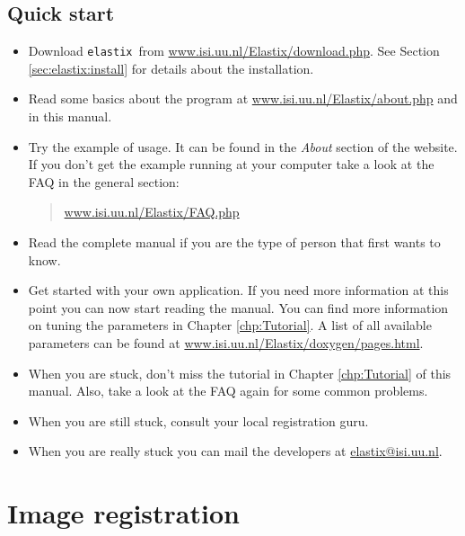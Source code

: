 \documentclass[]{report}
\newcommand{\elastix}{\texttt{elastix}}
\begin{document}
\section{Quick start}

\begin{itemize}
\item Download \elastix\ from
\url{www.isi.uu.nl/Elastix/download.php}. See Section
\ref{sec:elastix:install} for details about the installation.

\item Read some basics about the program at
\url{www.isi.uu.nl/Elastix/about.php} and in this manual.

\item Try the example of usage. It can be found in the \emph{About}
section of the website. If you don't get the example running at your
computer take a look at the FAQ in the general section:
\begin{quote}
\url{www.isi.uu.nl/Elastix/FAQ.php}
\end{quote}

\item Read the complete manual if you are the type of person that
first wants to know.

\item Get started with your own application. If you need more
information at this point you can now start reading the manual. You
can find more information on tuning the parameters in Chapter
\ref{chp:Tutorial}. A list of all available parameters can be found
at \url{www.isi.uu.nl/Elastix/doxygen/pages.html}.

\item When you are stuck, don't miss the tutorial in Chapter
\ref{chp:Tutorial} of this manual. Also, take a look at the FAQ again
for some common problems.

\item When you are still stuck, consult your local registration guru.

\item When you are really stuck you can mail the developers at
\url{elastix@isi.uu.nl}.
\end{itemize}



\chapter{Image registration}\label{chp:Registration}
\end{document}
